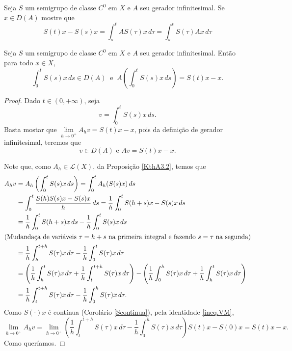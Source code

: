 \begin{xca}
Seja $S$ um semigrupo de classe $C^0$ em $X$ e $A$ seu gerador infinitesimal. Se $x\in D(A)$ mostre que
\begin{equation}\label{TFC1}
S(t)x-S(s)x=\int_s^t AS(\tau)x\,d\tau =\int_s^t S(\tau)Ax\,d\tau
\end{equation}
\end{xca}

\begin{proposition}\label{prop2.11}
Seja $S$ um semigrupo de classe $C^0$ em $X$ e $A$ seu gerador infinitesimal. Então para todo $x\in X$, 
\[\int_0^tS(s)x\,ds\in D(A)\ \text{ e }\ A\left(\int_0^t S(s)x\,ds\right)=S(t)x-x.\]
\end{proposition}
\begin{proof}
   Dado $t\in (0,+\infty)$, seja 
\begin{equation*}
v=\int_0^t S(s)x\, ds.
\end{equation*}
Basta mostar que $\lim\limits_{h\to 0^+} A_hv=S(t)x-x$, pois da definição de gerador infinitesimal, teremos que
\[v\in D(A) \text{ e } Av=S(t)x-x.\]

Note que, como $A_h \in \mathcal{L}(X)$, da Proposição \ref{KthA3.2}, temos que
\begin{align*}
A_hv& =A_h\left(\int_0^t S(s)x\,ds\right)=\int_0^t A_h(S(s)x)\,ds\\
& =\int_0^t \frac{S(h)S(s)x-S(s)x}{h}\,ds
= \frac{1}{h}\int_0^t S(h+s)x-S(s)x\,ds\\
&= \frac{1}{h}\int_0^t S(h+s)x\,ds- \frac{1}{h}\int_0^t S(s)x\,ds\\
\shortintertext{(Mudandaça de variáveis $\tau=h+s$ na primeira integral e fazendo $s=\tau$ na segunda)}
&=\frac{1}{h}\int_h^{t+h} S(\tau)x\,d\tau- \frac{1}{h}\int_0^t S(\tau)x\,d\tau\\
&=\left(\frac{1}{h}\int_h^{t} S(\tau)x\,d\tau+\frac{1}{h}\int_t^{t+h} S(\tau)x\,d\tau\right) -
 \left(\frac{1}{h}\int_0^h S(\tau)x\,d\tau+\frac{1}{h}\int_h^t S(\tau)x\,d\tau\right)\\
&=\frac{1}{h}\int_t^{t+h} S(\tau)x\,d\tau-\frac{1}{h}\int_0^h S(\tau)x\,d\tau.
\end{align*}
Como $S(\cdot)x$ é contínua (Corolário \ref{Scontinua}), pela identidade \eqref{ineq.VM}, 
\begin{equation*}
\lim\limits_{h\to 0^+} A_hv =\lim\limits_{h\to 0^+} \left(\frac{1}{h}\int_t^{t+h} S(\tau)x\,d\tau-\frac{1}{h}\int_0^h S(\tau)x\,d\tau\right) S(t)x-S(0)x=S(t)x-x.
\end{equation*}
Como queríamos.
\end{proof}

